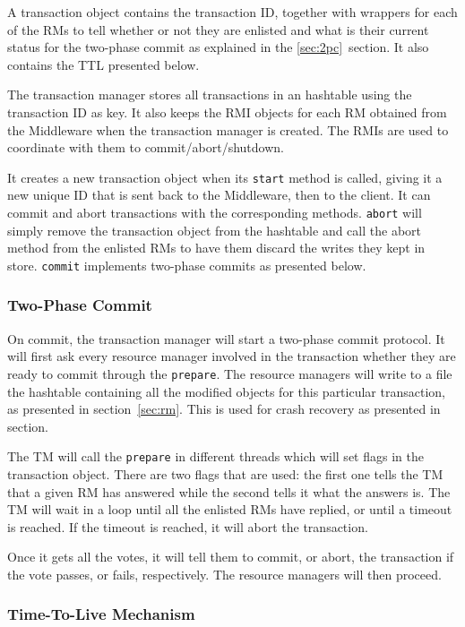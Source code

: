 \documentclass[12pt]{article}
\theoremstyle{plain}%
\theoremstyle{definition}
\theoremstyle{remark}
\newcommand{\java}[1]{{\lstinline!#1!}}
\begin{document}
A transaction object contains the transaction ID, together with wrappers
for each of the RMs to tell whether or not they are enlisted and what
is their current status for the two-phase commit as explained in the
\ref{sec:2pc}~section. It also contains the TTL presented below.

The transaction manager stores all transactions in an hashtable using 
the transaction ID as key. It also keeps the RMI objects for each RM 
obtained from the Middleware when the transaction manager is created. 
The RMIs are used to coordinate with them to commit/abort/shutdown.

It creates a new transaction object when its \java{start} method is 
called, giving it a new unique ID that is sent back to the Middleware, 
then to the client. It can commit and abort transactions with the 
corresponding methods. \java{abort} will simply remove the transaction 
object from the hashtable and call the abort method from the enlisted 
RMs to have them discard the writes they kept in store. \java{commit}
implements two-phase commits as presented below.

\subsubsection{Two-Phase Commit \label{sec:2pc}}

On commit, the transaction manager will start a two-phase commit
protocol. It will first ask every resource manager involved in the
transaction whether they are ready to commit through the \java{prepare}. 
The resource managers will write to a file the hashtable containing 
all the modified objects for this particular transaction, as presented 
in section~\ref{sec:rm}. This is used for crash recovery as presented
in section. %

The TM will call the \java{prepare} in different threads which will set 
flags in the transaction object. There are two flags that are used: the
first one tells the TM that a given RM has answered while the second
tells it what the answers is. The TM will wait in a loop until all
the enlisted RMs have replied, or until a timeout is reached. If the 
timeout is reached, it will abort the transaction.

Once it gets all the votes, it will tell them to commit, or abort, the 
transaction if the vote passes, or fails, respectively. The resource
managers will then proceed.

\subsubsection{Time-To-Live Mechanism\label{sec:ttl}}
\end{document}
